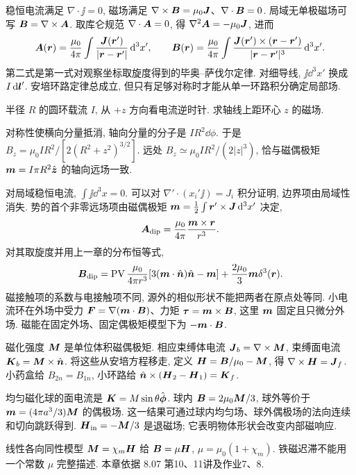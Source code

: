 稳恒电流满足 $\nabla\cdot\jj=0$, 磁场满足 $\nabla\times\boldsymbol{B}=\mu_0\boldsymbol{J}$、$\nabla\cdot\boldsymbol{B}=0$. 局域无单极磁场可写 $\boldsymbol{B}=\nabla\times\boldsymbol{A}$. 取库仑规范 $\nabla\cdot\boldsymbol{A}=0$, 得 $\nabla^2\boldsymbol{A}=-\mu_0\boldsymbol{J}$, 进而
\[
\boldsymbol{A}(\boldsymbol{r})=\frac{\mu_0}{4\pi}\int\frac{\boldsymbol{J}(\boldsymbol{r}')}{|\boldsymbol{r}-\boldsymbol{r}'|}\,\mathrm d^3x',\qquad
\boldsymbol{B}(\boldsymbol{r})=\frac{\mu_0}{4\pi}\int\frac{\boldsymbol{J}(\boldsymbol{r}')\times(\boldsymbol{r}-\boldsymbol{r}')}{|\boldsymbol{r}-\boldsymbol{r}'|^3}\,\mathrm d^3x'.
\]
第二式是第一式对观察坐标取旋度得到的毕奥--萨伐尔定律. 对细导线, $\jj\dd^3x'$ 换成 $I\,\mathrm d\boldsymbol{l}'$. 安培环路定律总成立, 但只有足够对称时才能从单一环路积分确定局部场.

\begin{example}
半径 $R$ 的圆环载流 $I$, 从 $+z$ 方向看电流逆时针. 求轴线上距环心 $z$ 的磁场.
\end{example}
\begin{solution}
对称性使横向分量抵消, 轴向分量的分子是 $I R^2\dd\phi$. 于是 $B_z=\mu_0IR^2/[2(R^2+z^2)^{3/2}]$. 远处 $B_z\simeq\mu_0IR^2/(2|z|^3)$, 恰与磁偶极矩 $\boldsymbol{m}=I\pi R^2\hat{\boldsymbol{z}}$ 的轴向远场一致.
\end{solution}

对局域稳恒电流, $\int\jj\dd^3x=0$. 可以对 $\nabla'\cdot(x_i'\jj)=J_i$ 积分证明, 边界项由局域性消失. 势的首个非零远场项由磁偶极矩 $\boldsymbol{m}=\frac12\int\boldsymbol{r}'\times\boldsymbol{J}\,\mathrm d^3x'$ 决定,
\[
\boldsymbol{A}_\mathrm{dip}=\frac{\mu_0}{4\pi}\frac{\boldsymbol{m}\times\boldsymbol{r}}{r^3}.
\]
对其取旋度并用上一章的分布恒等式,
\[
\boldsymbol{B}_\mathrm{dip}=\operatorname{PV}\frac{\mu_0}{4\pi r^3}[3(\boldsymbol{m}\cdot\hat{\boldsymbol{n}})\hat{\boldsymbol{n}}-\boldsymbol{m}]
+\frac{2\mu_0}3\boldsymbol{m}\delta^3(\boldsymbol{r}).
\]
磁接触项的系数与电接触项不同, 源外的相似形状不能把两者在原点处等同. 小电流环在外场中受力 $\boldsymbol{F}=\nabla(\boldsymbol{m}\cdot\boldsymbol{B})$、力矩 $\boldsymbol{\tau}=\boldsymbol{m}\times\boldsymbol{B}$, 这里 $\boldsymbol{m}$ 固定且只微分外场. 磁能在固定外场、固定偶极矩模型下为 $-\boldsymbol{m}\cdot\boldsymbol{B}$.

磁化强度 $\boldsymbol{M}$ 是单位体积磁偶极矩. 相应束缚体电流 $\boldsymbol{J}_b=\nabla\times\boldsymbol{M}$, 束缚面电流 $\boldsymbol{K}_b=\boldsymbol{M}\times\hat{\boldsymbol{n}}$. 将这些从安培方程移走, 定义 $\boldsymbol{H}=\boldsymbol{B}/\mu_0-\boldsymbol{M}$, 得 $\nabla\times\boldsymbol{H}=\boldsymbol{J}_f$. 小药盒给 $B_{2n}=B_{1n}$, 小环路给 $\hat{\boldsymbol{n}}\times(\boldsymbol{H}_2-\boldsymbol{H}_1)=\boldsymbol{K}_f$.

均匀磁化球的面电流是 $\boldsymbol{K}=M\sin\theta\hat{\boldsymbol{\phi}}$. 球内 $\boldsymbol{B}=2\mu_0\boldsymbol{M}/3$, 球外等价于 $\boldsymbol{m}=(4\pi a^3/3)\boldsymbol{M}$ 的偶极场. 这一结果可通过球内均匀场、球外偶极场的法向连续和切向跳跃得到. $\boldsymbol{H}_\mathrm{in}=-\boldsymbol{M}/3$ 是退磁场; 它表明物体形状会改变内部磁响应.

线性各向同性模型 $\boldsymbol{M}=\chi_m\boldsymbol{H}$ 给 $\boldsymbol{B}=\mu\boldsymbol{H}$, $\mu=\mu_0(1+\chi_m)$. 铁磁迟滞不能用一个常数 $\mu$ 完整描述. 本章依据 8.07 第10、11讲及作业7、8.


